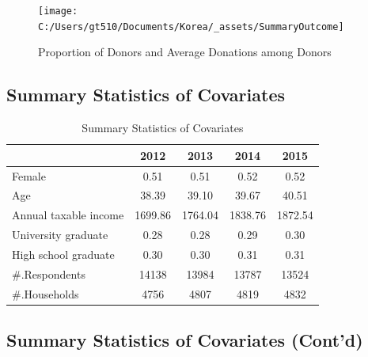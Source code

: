 \documentclass[ review  , 3p ]{elsarticle}
\begin{document}
  \begin{figure}
  
  {\centering \texttt{[image: C:/Users/gt510/Documents/Korea/\_assets/SummaryOutcome]} 
  
  }
  
  \caption{Proportion of Donors and Average Donations among Donors}\label{fig:unnamed-chunk-1}
  \end{figure}
  
  \hypertarget{summary-statistics-of-covariates}{%
  \subsection{Summary Statistics of Covariates}\label{summary-statistics-of-covariates}}
  
  \begin{table}
  
  \caption{\label{tab:kableSummaryCovariate}Summary Statistics of Covariates}
  \centering
  \begin{tabular}[t]{lcccc}
  \toprule
   & 2012 & 2013 & 2014 & 2015\\
  \midrule
  Female & 0.51 & 0.51 & 0.52 & 0.52\\
  Age & 38.39 & 39.10 & 39.67 & 40.51\\
  Annual taxable income & 1699.86 & 1764.04 & 1838.76 & 1872.54\\
  University graduate & 0.28 & 0.28 & 0.29 & 0.30\\
  High school graduate & 0.30 & 0.30 & 0.31 & 0.31\\
  \#.Respondents & 14138 & 13984 & 13787 & 13524\\
  \#.Households & 4756 & 4807 & 4819 & 4832\\
  \bottomrule
  \end{tabular}
  \end{table}
  
  \hypertarget{summary-statistics-of-covariates-contd}{%
  \subsection{Summary Statistics of Covariates (Cont'd)}\label{summary-statistics-of-covariates-contd}}
  
\end{document}

